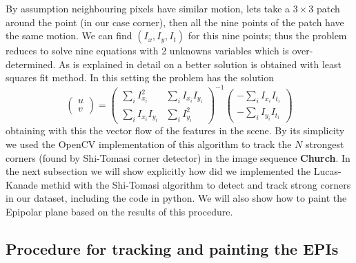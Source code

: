 \begin{itemize}
\bigskip

By assumption neighbouring pixels have similar motion, lets take a $3\times 3$ patch around the point (in our case corner), then all the nine points of the patch have the same motion. We can find $(I_x,I_y,I_t)$ for this nine points; thus the problem reduces to solve nine equations with 2 unknowns variables which is over-determined. As is explained in detail on \cite{LucasKanade} a better solution is obtained with least squares fit method. In this setting the problem has the solution
\begin{equation}
\label{eq:C2S5E13}
\left( 
\begin{matrix}
u \\
v 
\end{matrix}
\right) = 
\left(
\begin{matrix}
\sum_i I_{x_i}^2 & \sum_i I_{x_i}I_{y_i} \\
\sum_i I_{x_i}I_{y_i} & \sum_i I_{y_i}^2 
\end{matrix}
\right)^{-1}
\left(
\begin{matrix}
-\sum_i I_{x_i}I_{t_i}\\
-\sum_i I_{y_i}I_{t_i}
\end{matrix}
\right)
\end{equation}
obtaining with this the vector flow of the features in the scene. By its simplicity we used the OpenCV implementation of this algorithm to track the $N$ strongest corners (found by Shi-Tomasi corner detector) in the image sequence \textbf{Church}. In the next subsection we will show explicitly how did we implemented the Lucas-Kanade methid with the Shi-Tomasi algorithm to detect and track strong corners in our dataset, including the code in python. We will also show how to paint the Epipolar plane based on the results of this procedure. 
\end{itemize}
 
\subsection{Procedure for tracking and painting the EPIs}
\label{sec:proc_track}

